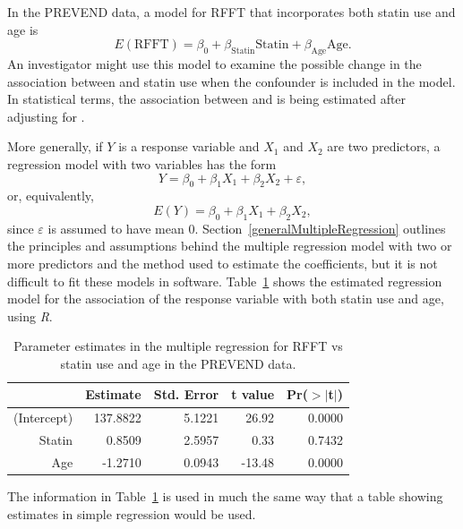 In the PREVEND data, a model for RFFT that incorporates both statin use and age is
 \[
    E(\text{RFFT}) = \beta_0 + \beta_{\text{Statin}}\text{Statin} + \beta_{\text{Age}}\text{Age}.
	\label{RFFTStatinAgeEquation}
 \]
An investigator might use this model to examine the possible change in the association between  and statin use when the confounder  is included in the model.  In statistical terms, the association between  and  is being estimated after adjusting for .

More generally, if $Y$ is a response variable and $X_1$ and $X_2$ are two predictors, a regression model with two variables has the form 
\[
Y = \beta_0 + \beta_1 X_1 + \beta_2 X_2 + \varepsilon,
\]
or, equivalently,
\[
E(Y) = \beta_0 + \beta_1 X_1 + \beta_2 X_2,
\]
since $\varepsilon$ is assumed to have mean 0.  Section~\ref{generalMultipleRegression} outlines the principles and assumptions behind the multiple regression model with two or more predictors and the method used to estimate the coefficients, but it is not difficult to fit these models in software.  Table~\ref{prevendRFFTStatinAgeRegression} shows the estimated regression model for the association of the response variable  with both statin use and age, using \textsl{R}.  
\begin{table}[ht]
\centering
\begin{tabular}{rrrrr}
  \hline
 & Estimate & Std. Error & t value & Pr($>$$|$t$|$) \\ 
  \hline
(Intercept) & 137.8822 & 5.1221 & 26.92 & 0.0000 \\ 
  Statin & 0.8509 & 2.5957 & 0.33 & 0.7432 \\ 
  Age & -1.2710 & 0.0943 & -13.48 & 0.0000 \\ 
   \hline
\end{tabular}
\caption{Parameter estimates in the 
       multiple regression for RFFT vs statin use and age in 
       the PREVEND data.} 
\label{prevendRFFTStatinAgeRegression}
\end{table}
 

The information in Table~\ref{prevendRFFTStatinAgeRegression} is used in much the same way that a table showing estimates in simple regression would be used.


